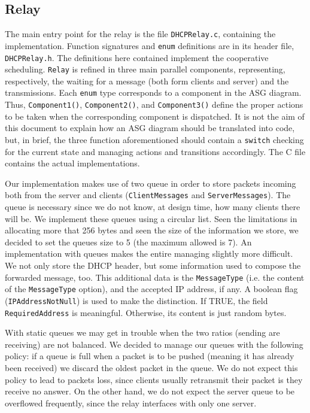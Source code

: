 \newpage
\subsection{Relay}
The main entry point for the relay is the file \texttt{DHCPRelay.c}, containing the implementation. Function signatures and \texttt{enum} definitions are in its header file, \texttt{DHCPRelay.h}. The definitions here contained implement the cooperative scheduling. \texttt{Relay} is refined in three main parallel components, representing, respectively, the waiting for a message (both form clients and server) and the transmissions. Each \texttt{enum} type corresponds to a component in the ASG diagram. Thus, \texttt{Component1()}, \texttt{Component2()}, and \texttt{Component3()} define the proper actions to be taken when the corresponding component is dispatched. It is not the aim of this document to explain how an ASG diagram should be translated into code, but, in brief, the three function aforementioned should contain a \texttt{switch} checking for the current state and managing actions and transitions accordingly. The C file contains the actual implementations.

Our implementation makes use of two queue in order to store packets incoming both from the server and clients (\texttt{ClientMessages} and \texttt{ServerMessages}). The queue is necessary since we do not know, at design time, how many clients there will be. We implement these queues using a circular list. Seen the limitations in allocating more that 256 bytes and seen the size of the information we store, we decided to set the queues size to 5 (the maximum allowed is 7). An implementation with queues makes the entire managing slightly more difficult. We not only store the DHCP header, but some information used to compose the forwarded message, too. This additional data is the \texttt{MessageType} (i.e. the content of the \texttt{MessageType} option), and the accepted IP address, if any. A boolean flag (\texttt{IPAddressNotNull}) is used to make the distinction. If TRUE, the field \texttt{RequiredAddress} is meaningful. Otherwise, its content is just random bytes.

With static queues we may get in trouble when the two ratios (sending are receiving) are not balanced. We decided to manage our queues with the following policy: if a queue is full when a packet is to be pushed (meaning it has already been received) we discard the oldest packet in the queue. We do not expect this policy to lead to packets loss, since clients usually retransmit their packet is they receive no answer. On the other hand, we do not expect the server queue to be overflowed frequently, since the relay interfaces with only one server. 

